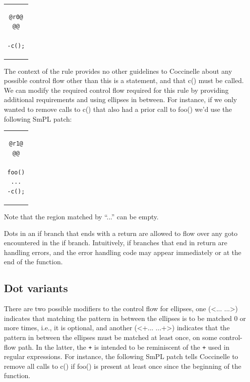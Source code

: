 \begin{center}
\begin{tabular}{c}
\begin{lstlisting}[language=Cocci]
@r0@
@@

-c();
\end{lstlisting}\\
\end{tabular}
\end{center}

The context of the rule provides no other guidelines to Coccinelle
about any possible control flow other than this is a statement, and that
c() must be called. We can modify the required control flow required for
this rule by providing additional requirements and using ellipses in between.
For instance, if we only wanted to remove calls to c() that also
had a prior call to foo() we'd use the following SmPL patch:

\begin{center}
\begin{tabular}{c}
\begin{lstlisting}[language=Cocci]
@r1@
@@

foo()
...
-c();
\end{lstlisting}\\
\end{tabular}
\end{center}

Note that the region matched by ``...'' can be empty.

Dots in an if branch that ends with a return are allowed to flow over any
goto encountered in the if branch.  Intuitively, if branches that end in
return are handling errors, and the error handling code may appear
immediately or at the end of the function.

\subsection{Dot variants}
There are two possible modifiers to the control flow for ellipses, one
(<... ...>) indicates that matching the pattern in between the ellipses is
to be matched 0 or more times, i.e., it is
optional, and another (<+... ...+>) indicates that the pattern in between
the ellipses must be matched at least once, on some control-flow path.  In
the latter, the \texttt{+} is intended to be reminiscent of the \texttt{+}
used in regular expressions.  For instance, the following SmPL patch tells
Coccinelle to remove all calls to c() if foo() is present at least
once since the beginning of the function.

